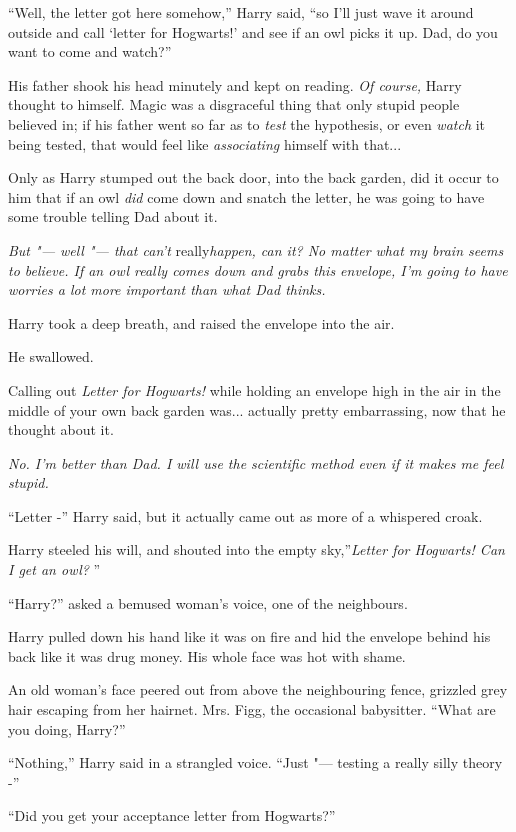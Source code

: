 ``Well, the letter got here somehow,'' Harry said, ``so I'll just wave
it around outside and call `letter for Hogwarts!' and see if an owl
picks it up. Dad, do you want to come and watch?''

His father shook his head minutely and kept on reading. \emph{Of
course,} Harry thought to himself. Magic was a disgraceful thing that
only stupid people believed in; if his father went so far as to
\emph{test} the hypothesis, or even \emph{watch} it being tested, that
would feel like \emph{associating} himself with that...

Only as Harry stumped out the back door, into the back garden, did it
occur to him that if an owl \emph{did} come down and snatch the letter,
he was going to have some trouble telling Dad about it.

\emph{But "--- well "--- that can't} really\emph{happen, can it? No matter
what my brain seems to believe. If an owl really comes down and grabs
this envelope, I'm going to have worries a lot more important than what
Dad thinks.}

Harry took a deep breath, and raised the envelope into the air.

He swallowed.

Calling out \emph{Letter for Hogwarts!} while holding an envelope high
in the air in the middle of your own back garden was... actually
pretty embarrassing, now that he thought about it.

\emph{No. I'm better than Dad. I will use the scientific method even if
it makes me feel stupid.}

``Letter -'' Harry said, but it actually came out as more of a whispered
croak.

Harry steeled his will, and shouted into the empty sky,''\emph{Letter
for Hogwarts! Can I get an owl?} ''

``Harry?'' asked a bemused woman's voice, one of the neighbours.

Harry pulled down his hand like it was on fire and hid the envelope
behind his back like it was drug money. His whole face was hot with
shame.

An old woman's face peered out from above the neighbouring fence,
grizzled grey hair escaping from her hairnet. Mrs. Figg, the occasional
babysitter. ``What are you doing, Harry?''

``Nothing,'' Harry said in a strangled voice. ``Just "--- testing a really
silly theory -''

``Did you get your acceptance letter from Hogwarts?''

